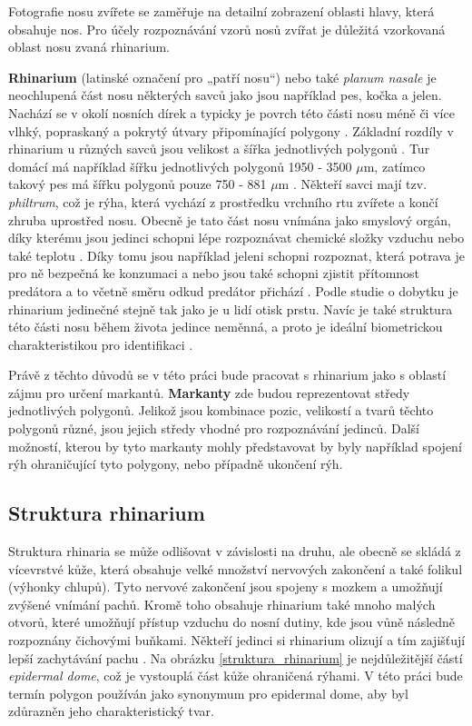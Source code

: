 Fotografie nosu zvířete se zaměřuje na detailní zobrazení oblasti hlavy, která obsahuje nos. Pro účely rozpoznávání vzorů nosů zvířat je důležitá vzorkovaná oblast nosu zvaná rhinarium. 

\textbf{Rhinarium} (latinské označení pro „patří nosu“) nebo také \textit{planum nasale} je neochlupená část nosu některých savců jako jsou například pes, kočka a jelen. Nachází se v okolí nosních dírek a typicky je povrch této části nosu méně či více vlhký, popraskaný a pokrytý útvary připomínající polygony \cite{RhinariumDef}. Základní rozdíly v rhinarium u různých savců jsou velikost a šířka jednotlivých polygonů \cite{structureRhinarium}. Tur domácí má například šířku jednotlivých polygonů  1950 - 3500 $\mu$m, zatímco takový pes má šířku polygonů pouze 750 - 881 $\mu$m \cite{structureRhinarium}. Někteří savci mají tzv. \textit{philtrum}, což je rýha, která vychází z prostředku vrchního rtu zvířete a končí zhruba uprostřed nosu. Obecně je tato část nosu vnímána jako smyslový orgán, díky kterému jsou jedinci schopni lépe rozpoznávat chemické složky vzduchu nebo také teplotu \cite{structureRhinarium}. Díky tomu jsou například jeleni schopni rozpoznat, která potrava je pro ně bezpečná ke konzumaci a nebo jsou také schopni zjistit přítomnost predátora a to včetně směru odkud predátor přichází \cite{deerInteresting}. Podle studie o dobytku \cite{historie} je rhinarium jedinečné stejně tak jako je u lidí otisk prstu. Navíc je také struktura této části nosu během života jedince neměnná, a proto je ideální biometrickou charakteristikou pro identifikaci \cite{ani11092664, historie}.

Právě z těchto důvodů se v této práci bude pracovat s rhinarium jako s oblastí zájmu pro určení markantů. \textbf{Markanty} zde budou reprezentovat středy jednotlivých polygonů. Jelikož jsou kombinace pozic, velikostí a tvarů těchto polygonů různé, jsou jejich středy vhodné pro rozpoznávání jedinců. Další možností, kterou by tyto markanty mohly představovat by byly například spojení rýh ohraničující tyto polygony, nebo případně ukončení rýh. 

\subsection{Struktura rhinarium}
\label{Struktura Rhinarium}

Struktura rhinaria se může odlišovat v závislosti na druhu, ale obecně se skládá z vícevrstvé kůže, která obsahuje velké množství nervových zakončení a také folikul (výhonky chlupů). Tyto nervové zakončení jsou spojeny s mozkem a umožňují zvýšené vnímání pachů. Kromě toho obsahuje rhinarium také mnoho malých otvorů, které umožňují přístup vzduchu do nosní dutiny, kde jsou vůně následně rozpoznány čichovými buňkami. Někteří jedinci si rhinarium olizují a tím zajišťují lepší zachytávání pachu \cite{deerInteresting}. Na obrázku \ref{struktura_rhinarium} je nejdůležitější částí \textit{epidermal dome}, což je vystouplá část kůže ohraničená rýhami. V této práci bude termín polygon používán jako synonymum pro epidermal dome, aby byl zdůrazněn jeho charakteristický tvar.


